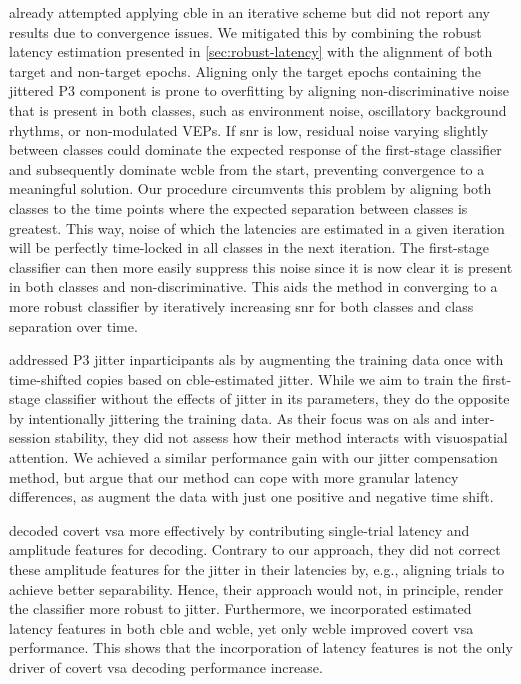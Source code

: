 \cite{Thompson2012} already attempted applying \ac{cble} in an iterative scheme
but did not report any results due to convergence issues.
We mitigated this by combining the robust latency estimation presented in
\cref{sec:robust-latency} with the alignment of both target and non-target
epochs.
Aligning only the target epochs containing the jittered P3 component is prone to
overfitting by aligning non-discriminative noise that is present in both
classes, such as environment noise, oscillatory background rhythms, or
non-modulated VEPs.
If \ac{snr} is low, residual noise varying slightly between classes could dominate
the expected response of the first-stage classifier and subsequently dominate
\ac{wcble} from the start, preventing convergence to a meaningful solution.
Our procedure circumvents this problem by aligning both classes to the time
points where the expected separation between classes is greatest.
This way, noise of which the latencies are estimated in a given iteration will be
perfectly time-locked in all classes in the next
iteration.
The first-stage classifier can then more easily suppress this noise since it is
now clear it is present in both classes and non-discriminative.
This aids the method in converging to a more robust classifier by iteratively
increasing \ac{snr} for both classes and class separation over time.

\cite{Zisk2022} addressed P3 jitter inparticipants \ac{als} by augmenting the
training data once with time-shifted copies based on \ac{cble}-estimated jitter.
While we aim to train the first-stage classifier without the effects of jitter
in its parameters, they do the opposite by intentionally jittering the
training data.
As their focus was on \ac{als} and inter-session stability, they
did not assess how their method interacts with visuospatial attention.
We achieved a similar performance gain with our jitter compensation method, but
argue that our method can cope with more granular latency differences, as
\cite{Zisk2022} augment the data with just one positive and negative time
shift.

\textcite{Hardiansyah2020} decoded covert \ac{vsa} more effectively by
contributing single-trial latency and amplitude features for decoding.
Contrary to our approach, they did not correct these amplitude
features for the jitter in their latencies by, e.g., aligning trials to achieve
better separability.
Hence, their approach would not, in principle, render the classifier more robust
to jitter.
Furthermore, we incorporated estimated latency features in both \ac{cble} and \ac{wcble},
yet only \ac{wcble} improved covert \ac{vsa} performance.
This shows that the incorporation of latency features is not the only driver of
covert \ac{vsa} decoding performance increase.

